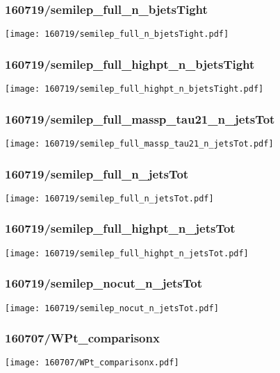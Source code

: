 \begin{frame}
   \frametitle{\small 160719/semilep\_full\_n\_bjetsTight}
   \centering
   \texttt{[image: 160719/semilep\_full\_n\_bjetsTight.pdf]}
\end{frame}

\begin{frame}
   \frametitle{\small 160719/semilep\_full\_highpt\_n\_bjetsTight}
   \centering
   \texttt{[image: 160719/semilep\_full\_highpt\_n\_bjetsTight.pdf]}
\end{frame}

\begin{frame}
   \frametitle{\small 160719/semilep\_full\_massp\_tau21\_n\_jetsTot}
   \centering
   \texttt{[image: 160719/semilep\_full\_massp\_tau21\_n\_jetsTot.pdf]}
\end{frame}

\begin{frame}
   \frametitle{\small 160719/semilep\_full\_n\_jetsTot}
   \centering
   \texttt{[image: 160719/semilep\_full\_n\_jetsTot.pdf]}
\end{frame}

\begin{frame}
   \frametitle{\small 160719/semilep\_full\_highpt\_n\_jetsTot}
   \centering
   \texttt{[image: 160719/semilep\_full\_highpt\_n\_jetsTot.pdf]}
\end{frame}

\begin{frame}
   \frametitle{\small 160719/semilep\_nocut\_n\_jetsTot}
   \centering
   \texttt{[image: 160719/semilep\_nocut\_n\_jetsTot.pdf]}
\end{frame}

\begin{frame}
   \frametitle{\small 160707/WPt\_comparisonx}
   \centering
   \texttt{[image: 160707/WPt\_comparisonx.pdf]}
\end{frame}


